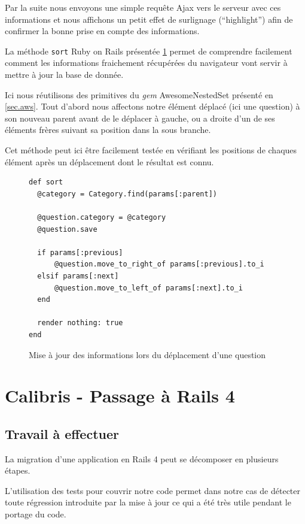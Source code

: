 \documentclass[12pt,a4paper]{book}
\begin{document}
Par la suite nous envoyons une simple requête Ajax vers le serveur avec ces informations et nous affichons un petit effet de surlignage (``highlight'') afin de confirmer la bonne prise en compte des informations.

La méthode \texttt{sort} Ruby on Rails présentée \cref{fig.sort3} permet de comprendre facilement comment les informations fraichement récupérées du navigateur vont servir à mettre à jour la base de donnée. 

Ici nous réutilisons des primitives du \textit{gem} AwesomeNestedSet présenté en \cref{sec.aws}. Tout d'abord nous affectons notre élément déplacé (ici une question) à son nouveau parent avant de le déplacer à gauche, ou a droite d'un de ses éléments frères suivant sa position dans la sous branche.

Cet méthode peut ici être facilement testée en vérifiant les positions de chaques élément après un déplacement dont le résultat est connu.

\begin{figure}[h]
\lstset{language=ruby}
\begin{lstlisting}
def sort
  @category = Category.find(params[:parent])

  @question.category = @category
  @question.save

  if params[:previous]
      @question.move_to_right_of params[:previous].to_i
  elsif params[:next]
      @question.move_to_left_of params[:next].to_i
  end

  render nothing: true
end
\end{lstlisting}
 \caption{Mise à jour des informations lors du déplacement d'une question}
 \label{fig.sort3}
\end{figure}

\section{Calibris - Passage à Rails 4} 

\subsection{Travail à effectuer}

La migration d'une application en Rails 4 peut se décomposer en plusieurs étapes. 

L'utilisation des tests pour couvrir notre code permet dans notre cas de détecter toute régression introduite par la mise à jour ce qui a été très utile pendant le portage du code.
\end{document}

